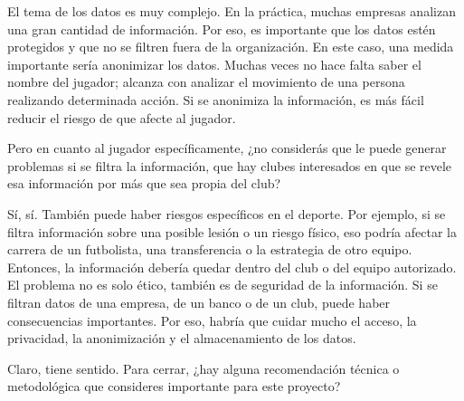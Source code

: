 \begin{description}[leftmargin=0pt, itemindent=\parindent, labelsep=0.5em, itemsep=0pt, parsep=0pt, topsep=0pt]
    \item[\textbf{Gonzalo Pereyra Metnyk:}] El tema de los datos es muy complejo. En la práctica, muchas empresas analizan una gran cantidad de información. Por eso, es importante que los datos estén protegidos y que no se filtren fuera de la organización. En este caso, una medida importante sería anonimizar los datos. Muchas veces no hace falta saber el nombre del jugador; alcanza con analizar el movimiento de una persona realizando determinada acción. Si se anonimiza la información, es más fácil reducir el riesgo de que afecte al jugador.

    \item[\textbf{Entrevistador:}] Pero en cuanto al jugador específicamente, ¿no considerás que le puede generar problemas si se filtra la información, que hay clubes interesados en que se revele esa información por más que sea propia del club?

    \item[\textbf{Gonzalo Pereyra Metnyk:}] Sí, sí. También puede haber riesgos específicos en el deporte. Por ejemplo, si se filtra información sobre una posible lesión o un riesgo físico, eso podría afectar la carrera de un futbolista, una transferencia o la estrategia de otro equipo. Entonces, la información debería quedar dentro del club o del equipo autorizado. El problema no es solo ético, también es de seguridad de la información. Si se filtran datos de una empresa, de un banco o de un club, puede haber consecuencias importantes. Por eso, habría que cuidar mucho el acceso, la privacidad, la anonimización y el almacenamiento de los datos.

    \item[\textbf{Entrevistador:}] Claro, tiene sentido. Para cerrar, ¿hay alguna recomendación técnica o metodológica que consideres importante para este proyecto?


\end{description}
